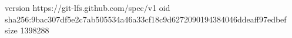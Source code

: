 version https://git-lfs.github.com/spec/v1
oid sha256:9bac307df5e2c7ab505534a46a33cf18c9d6272090194384046ddeaff97edbef
size 1398288
